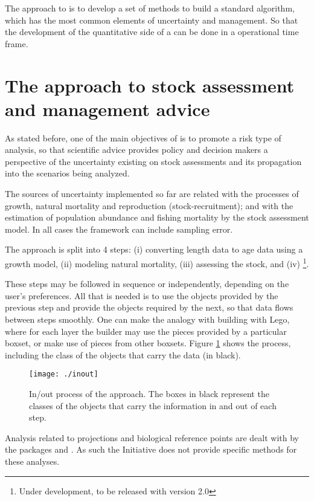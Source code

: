 \documentclass[a4paper,english,10pt]{article}\usepackage[]{graphicx}\usepackage[]{color}
\begin{document}
The \aFa approach to \MSE is to develop a set of methods to build a standard algorithm, which has the most common elements of uncertainty and management. So that the development of the quantitative side of a \MSE can be done in a operational time frame.

\section{The \aFa approach to stock assessment and management advice}

As stated before, one of the main objectives of \aFa is to promote a risk type of analysis, so that scientific advice provides policy and decision makers a perspective of the uncertainty existing on stock assessments and its propagation into the scenarios being analyzed.

The sources of uncertainty implemented so far are related with the processes of growth, natural mortality and reproduction (stock-recruitment); and with the estimation of population abundance and fishing mortality by the stock assessment model. In all cases the framework can include sampling error.

The approach is split into 4 steps: (i) converting length data to age data using a growth model, (ii) modeling natural mortality, (iii) assessing the stock, and (iv) \MSE\footnote{Under development, to be released with version 2.0}.

These steps may be followed in sequence or independently, depending on the user's preferences. All that is needed is to use the objects provided by the previous step and provide the objects required by the next, so that data flows between steps smoothly. One can make the analogy with building with Lego, where for each layer the builder may use the pieces provided by a particular boxset, or make use of pieces from other boxsets. Figure \ref{fig:inout} shows the process, including the class of the objects that carry the data (in black).

\begin{figure}[H]
\centering
\texttt{[image: ./inout]}
\caption{In/out process of the \aFa approach. The boxes in black represent the classes of the objects that carry the information in and out of each step.}
\label{fig:inout}
\end{figure}

Analysis related to projections and biological reference points are dealt with by the  packages  and . As such the Initiative does not provide specific methods for these analyses.
\end{document}
